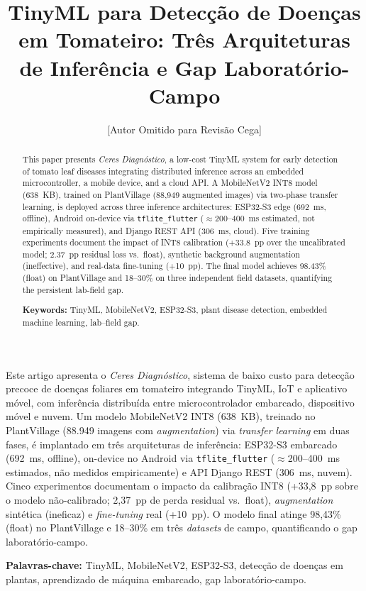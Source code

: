 \documentclass[12pt]{article}
\title{TinyML para Detecção de Doenças em Tomateiro: Três Arquiteturas de
Inferência e Gap Laboratório-Campo}
\author{[Autor Omitido para Revisão Cega]\inst{1}}
\begin{document}
\maketitle

\begin{abstract}
This paper presents \textit{Ceres Diagnóstico}, a low-cost TinyML system for early
detection of tomato leaf diseases integrating distributed inference across an
embedded microcontroller, a mobile device, and a cloud API.
A MobileNetV2 INT8 model (638~KB), trained on PlantVillage (88{,}949 augmented
images) via two-phase transfer learning, is deployed across three inference
architectures:
ESP32-S3 edge (692~ms, offline), Android on-device via \texttt{tflite\_flutter}
($\approx$200--400~ms estimated, not empirically measured), and Django REST API (306~ms, cloud). Five training
experiments document the impact of INT8 calibration (+33.8~pp over the uncalibrated
model; 2.37~pp residual loss vs.\ float), synthetic background augmentation
(ineffective), and real-data fine-tuning (+10~pp). The final model achieves 98.43\%
(float) on PlantVillage and 18--30\% on three independent field datasets,
quantifying the persistent lab-field gap.

\vspace{0.5em}\noindent\textbf{Keywords:} TinyML, MobileNetV2, ESP32-S3, plant
disease detection, embedded machine learning, lab--field gap.
\end{abstract}

\begin{resumo}
Este artigo apresenta o \textit{Ceres Diagnóstico}, sistema de baixo custo para
detecção precoce de doenças foliares em tomateiro integrando TinyML, IoT e
aplicativo móvel, com inferência distribuída entre microcontrolador embarcado,
dispositivo móvel e nuvem. Um modelo MobileNetV2 INT8 (638~KB), treinado no PlantVillage
(88.949 imagens com \textit{augmentation}) via \textit{transfer learning} em duas
fases, é implantado em três arquiteturas de inferência: ESP32-S3 embarcado
(692~ms, offline), on-device no
Android via \texttt{tflite\_flutter} ($\approx$200--400~ms estimados, não medidos empiricamente) e API Django
REST (306~ms, nuvem). Cinco experimentos documentam o impacto da calibração INT8
(+33,8~pp sobre o modelo não-calibrado; 2,37~pp de perda residual vs.\ float),
\textit{augmentation} sintética (ineficaz) e \textit{fine-tuning} real (+10~pp). O modelo final atinge
98,43\% (float) no PlantVillage e 18--30\% em três \textit{datasets} de campo,
quantificando o gap laboratório-campo.

\vspace{0.5em}\noindent\textbf{Palavras-chave:} TinyML, MobileNetV2, ESP32-S3,
detecção de doenças em plantas, aprendizado de máquina embarcado, gap
laboratório-campo.
\end{resumo}
\end{document}
